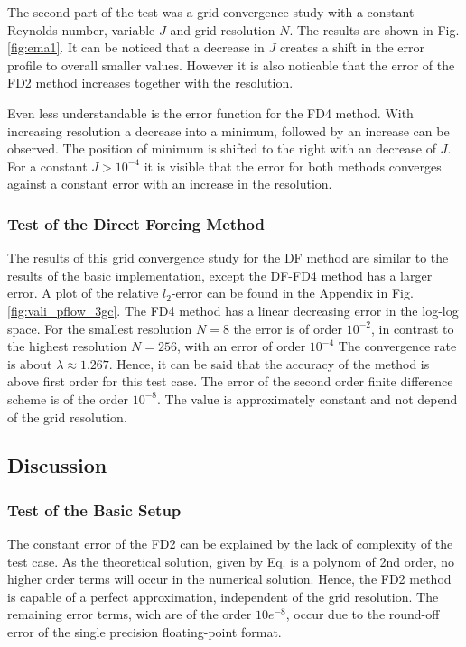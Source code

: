 The second part of the test was a grid convergence study with a constant Reynolds number, variable $J$ and grid resolution $N$.
The results are shown in Fig. \ref{fig:ema1}.
It can be noticed that a decrease in $J$ creates a shift in the error profile to overall smaller values.
However it is also noticable that the error of the FD2 method increases together with the resolution.

Even less understandable is the error function for the FD4 method.
With increasing resolution  a decrease into a minimum, followed by an increase can be observed.
The position of minimum is shifted to the right with an decrease of $J$.
For a constant $J>10^{-4}$ it is visible that the error for both methods converges against a
constant error  with an increase in the resolution.

\clearpage

\subsubsection{Test of the Direct Forcing Method}

The results of this grid convergence study for the DF method
are similar to the results of the basic implementation, except the DF-FD4 method has a larger error.
A plot of the relative $l_2$-error can be found in the Appendix in Fig.\ref{fig:vali_pflow_3gc}.
The FD4 method has a linear decreasing error in the log-log space.
For the smallest resolution $N=8$ the error is of order $10^{-2}$,
in contrast to the highest resolution $N=256$, with an error of order $10^{-4}$
The convergence rate is about $\lambda\approx1.267$.
Hence, it can be said that the accuracy of the method is above first order for this test case.
The error of the second order finite difference scheme is of the order $10^{-8}$.
The value is approximately constant and not depend of the grid resolution.

\subsection{Discussion}
\subsubsection{Test of the Basic Setup}

The constant error of the FD2 can be explained by the lack of complexity of the test case.
As the theoretical solution, given by Eq. \label{vali:pflow_navstok} is a polynom of 2nd order,
no higher order terms will occur in the numerical solution.
Hence, the FD2 method is capable of a perfect approximation, independent of the
grid resolution. The remaining error terms, wich are of the order $10e^{-8}$,
occur due to the round-off error of the single precision floating-point format.

